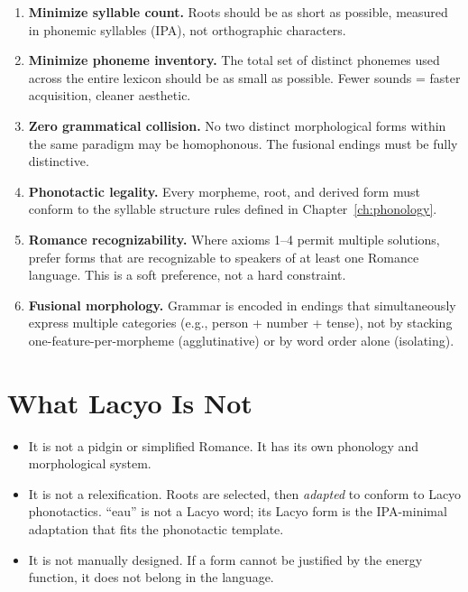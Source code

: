 \documentclass[12pt]{book}
\begin{document}
\begin{enumerate}
  \item \textbf{Minimize syllable count.}
        Roots should be as short as possible, measured in phonemic syllables
        (IPA), not orthographic characters.
  \item \textbf{Minimize phoneme inventory.}
        The total set of distinct phonemes used across the entire lexicon
        should be as small as possible. Fewer sounds = faster acquisition,
        cleaner aesthetic.
  \item \textbf{Zero grammatical collision.}
        No two distinct morphological forms within the same paradigm may be
        homophonous. The fusional endings must be fully distinctive.
  \item \textbf{Phonotactic legality.}
        Every morpheme, root, and derived form must conform to the syllable
        structure rules defined in Chapter~\ref{ch:phonology}.
  \item \textbf{Romance recognizability.}
        Where axioms 1--4 permit multiple solutions, prefer forms that are
        recognizable to speakers of at least one Romance language.
        This is a soft preference, not a hard constraint.
  \item \textbf{Fusional morphology.}
        Grammar is encoded in endings that simultaneously express multiple
        categories (e.g., person + number + tense), not by stacking
        one-feature-per-morpheme (agglutinative) or by word order alone
        (isolating).
\end{enumerate}

\section{What Lacyo Is Not}

\begin{itemize}
  \item It is not a pidgin or simplified Romance. It has its own phonology
        and morphological system.
  \item It is not a relexification. Roots are selected, then \emph{adapted}
        to conform to Lacyo phonotactics. ``eau'' is not a Lacyo word;
        its Lacyo form is the IPA-minimal adaptation that fits the phonotactic
        template.
  \item It is not manually designed. If a form cannot be justified by the
        energy function, it does not belong in the language.
\end{itemize}
\end{document}
